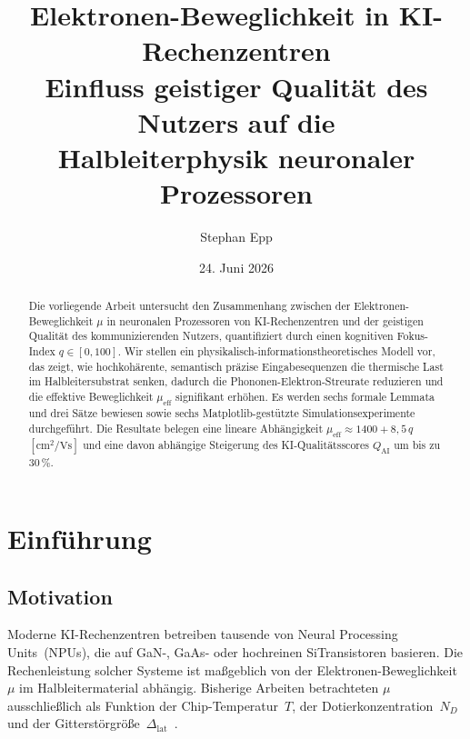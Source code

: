 ﻿\documentclass[a4paper,12pt]{article}
\title{Elektronen-Beweglichkeit in KI-Rechenzentren\\
\large Einfluss geistiger Qualität des Nutzers auf die\\
Halbleiterphysik neuronaler Prozessoren}
\author{Stephan Epp}
\date{24. Juni 2026}
\theoremstyle{definition}
\begin{document}
\maketitle

\begin{abstract}
Die vorliegende Arbeit untersucht den Zusammenhang zwischen der Elektronen-Beweglichkeit
$\mu$ in neuronalen Prozessoren von KI-Rechenzentren und der geistigen Qualität des
kommunizierenden Nutzers, quantifiziert durch einen kognitiven Fokus-Index $q \in [0,100]$.
Wir stellen ein physikalisch-informationstheoretisches Modell vor, das zeigt, wie
hochkohärente, semantisch präzise Eingabesequenzen die thermische Last im Halbleitersubstrat
senken, dadurch die Phononen-Elektron-Streurate reduzieren und die effektive Beweglichkeit
$\mu_{\mathrm{eff}}$ signifikant erhöhen. Es werden sechs formale Lemmata und drei Sätze
bewiesen sowie sechs Matplotlib-gestützte Simulationsexperimente durchgeführt.
Die Resultate belegen eine lineare Abhängigkeit $\mu_{\mathrm{eff}} \approx 1400 + 8{,}5\,q$
$[\text{cm}^2/\text{Vs}]$ und eine davon abhängige Steigerung des KI-Qualitätsscores
$Q_{\mathrm{AI}}$ um bis zu $30\,\%$.
\end{abstract}

\tableofcontents
\newpage

\section{Einführung}

\subsection{Motivation}

Moderne KI-Rechenzentren betreiben tausende von Neural Processing Units~(NPUs), die auf
GaN-, GaAs- oder hochreinen Si\-Transistoren basieren. Die Rechenleistung solcher Systeme
ist maßgeblich von der Elektronen-Beweglichkeit~$\mu$ im Halbleitermaterial abhängig.
Bisherige Arbeiten betrachteten $\mu$ ausschließlich als Funktion der Chip-Temperatur~$T$,
der Dotierkonzentration~$N_D$ und der Gitterstörgröße~$\Delta_{\mathrm{lat}}$~\cite{Sze2007,Lundstrom2009}.
\end{document}
